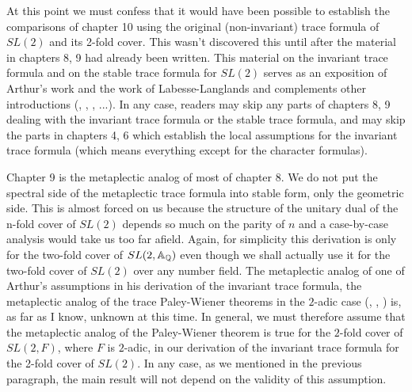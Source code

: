 \documentclass[12pt,thmsa]{book}
\begin{document}
At this point we must confess that it would have been possible to establish
the comparisons of chapter 10 using the original (non-invariant) trace
formula of $SL(2)$ and its 2-fold cover. This wasn't discovered this until
after the material in chapters 8, 9 had already been written. This material
on the invariant trace formula and on the stable trace formula for $SL(2)$
serves as an exposition of Arthur's work and the work of Labesse-Langlands
and complements other introductions (\cite{Sho}, \cite{A5}, \cite{A15}, \cite
{Lab} ...). In any case, readers may skip any parts of chapters 8, 9 dealing
with the invariant trace formula or the stable trace formula, and may skip
the parts in chapters 4, 6 which establish the local assumptions for the
invariant trace formula (which means everything except for the character
formulas).

Chapter 9 is the metaplectic analog of most of chapter 8. We do not put the
spectral side of the metaplectic trace formula into stable form, only the
geometric side. This is almost forced on us because the structure of the
unitary dual of the n-fold cover of $SL(2)$ depends so much on the parity of 
$n$ and a case-by-case analysis would take us too far afield. Again, for
simplicity this derivation is only for the two-fold cover of
$SL(2,{\Bbb{A}}_{\Bbb{Q}})$ even though we shall
actually use it for the two-fold cover of $SL(2)$ over any number field.
The metaplectic analog of one of
Arthur's assumptions \cite{A6} in his derivation of the
invariant trace formula, the metaplectic analog of the
trace Paley-Wiener theorems in the $2$-adic case (\cite{CD}, \cite{Bou}, \cite{Ao})
is, as far as I know, unknown at this time.
In general, we must therefore assume that the
metaplectic analog of the Paley-Wiener theorem is true for the
$2$-fold cover of $SL(2,F)$, where $F$ is $2$-adic,
in our derivation of the invariant trace formula for
the 2-fold cover of $SL(2)$. 
In any case, as we mentioned in the previous paragraph, the main result
will not depend on the validity of this assumption. 
\end{document}
